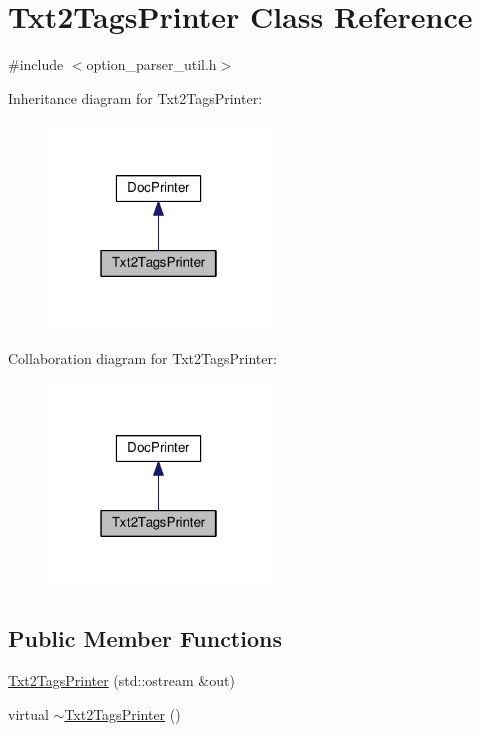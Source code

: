 \hypertarget{classTxt2TagsPrinter}{\section{Txt2\-Tags\-Printer Class Reference}
\label{classTxt2TagsPrinter}
}


{\ttfamily \#include $<$option\-\_\-parser\-\_\-util.\-h$>$}



Inheritance diagram for Txt2\-Tags\-Printer\-:
\nopagebreak
\begin{figure}[H]
\begin{center}
\leavevmode
\includegraphics[width=166pt]{classTxt2TagsPrinter__inherit__graph}
\end{center}
\end{figure}


Collaboration diagram for Txt2\-Tags\-Printer\-:
\nopagebreak
\begin{figure}[H]
\begin{center}
\leavevmode
\includegraphics[width=166pt]{classTxt2TagsPrinter__coll__graph}
\end{center}
\end{figure}
\subsection*{Public Member Functions}
\begin{DoxyCompactItemize}
\item 
\hyperlink{classTxt2TagsPrinter_a9fa4acfeec801cc35c8f077af51ea296}{Txt2\-Tags\-Printer} (std\-::ostream \&out)
\item 
virtual \hyperlink{classTxt2TagsPrinter_aa2524285af359ef98b76885ce8444b26}{$\sim$\-Txt2\-Tags\-Printer} ()
\end{DoxyCompactItemize}
